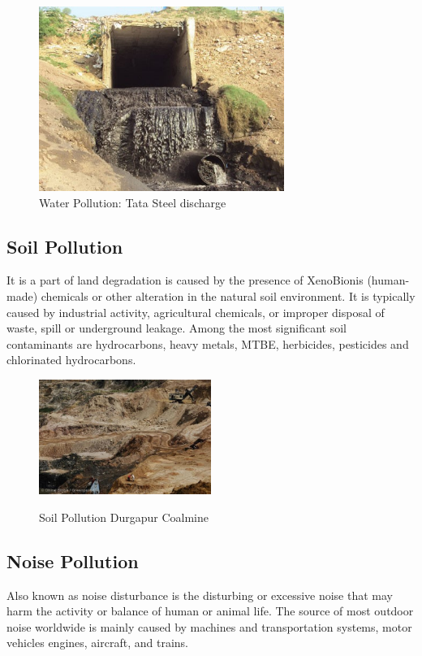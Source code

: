 \begin{figure}[h]
 \centering
  \includegraphics[width=80mm]{water.jpg}
  \caption{Water Pollution: Tata Steel discharge}
  \label{fig:Water Pollution: Tata Steel discharge}
\end{figure}

\subsection{Soil Pollution}
It is a part of land degradation is caused by the presence of XenoBionis (human-made) chemicals or other alteration in the natural soil environment. It is typically caused by industrial activity, agricultural chemicals, or improper disposal of waste, spill or underground leakage. Among the most significant soil contaminants are hydrocarbons, heavy metals, MTBE, herbicides, pesticides and chlorinated hydrocarbons.


\begin{figure}[h]
\centering
\includegraphics[width=0.5\textwidth]{./soil}\\[0.1in]
\label{Soil pollution: Durgapur coalmine}
 \caption{Soil Pollution Durgapur Coalmine}
 \label{soil pollution}
\end{figure}



\subsection{Noise Pollution}
Also known as noise disturbance is the disturbing or excessive noise that may harm the activity or balance of human or animal life. The source of most outdoor noise worldwide is mainly caused by machines and transportation systems, motor vehicles engines, aircraft, and trains.

